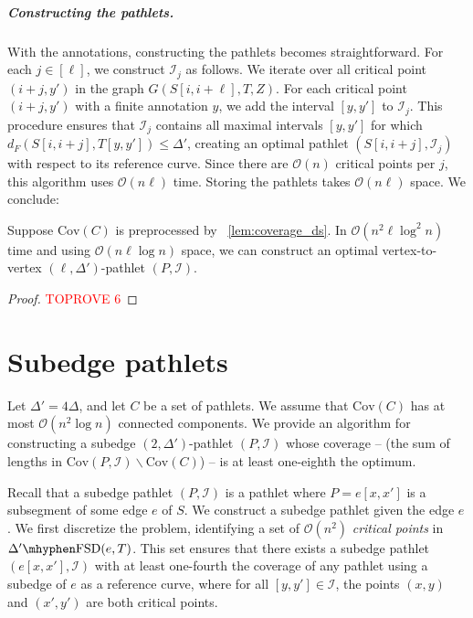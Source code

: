 \documentclass[a4paper,UKenglish,cleveref,thm-restate,notab]{lipics-v2021}
\newcommand{\dF}{\ensuremath{d_F}}
\newcommand{\FSD}[1][\Delta'] {\ensuremath{#1}\mhyphen\mathrm{FSD}}
\newcommand{\bigO}{\mathcal{O}}
\newcommand{\I}{\mathcal{I}}
\newcommand{\Cov}{\ensuremath{\mathrm{Cov}}}
\begin{document}
\subparagraph*{Constructing the pathlets.}
    With the annotations, constructing the pathlets becomes straightforward.
    For each $j \in [\ell]$, we construct $\I_j$ as follows.
    We iterate over all critical point $(i+j, y')$ in the graph $G(S[i, i+\ell], T, Z)$. 
    For each critical point $(i+j, y')$ with a finite annotation $y$, we add the interval $[y, y']$ to $\I_j$.
    This procedure ensures that $\I_j$ contains all maximal intervals $[y, y']$ for which $\dF(S[i, i+j], T[y, y']) \leq \Delta'$, creating an optimal pathlet $(S[i, i+j], \I_j)$ with respect to its reference curve.
    Since there are $\bigO(n)$ critical points per $j$, this algorithm uses $\bigO(n \ell)$ time.
    Storing the pathlets takes $\bigO(n \ell)$ space.
    We conclude:

    \begin{theorem}
    \label{thm:constructing_vertex-to-vertex}
        Suppose $\Cov(C)$ is preprocessed by ~\cref{lem:coverage_ds}.
        In $\bigO(n^2 \ell \log^2 n)$ time and using $\bigO(n \ell \log n)$ space, we can construct an optimal vertex-to-vertex $(\ell, \Delta')$-pathlet $(P, \I)$.
    \end{theorem}
    \begin{proof}\textcolor{red}{TOPROVE 6}\end{proof}

\section{Subedge pathlets}
\label{sec:subedge_pathlets}

    Let $\Delta' = 4\Delta$, and let $C$ be a set of pathlets. We assume that $\Cov(C)$ has at most $\bigO(n^2 \log n)$ connected components. 
    We provide an algorithm for constructing a subedge $(2, \Delta')$-pathlet $(P, \I)$ whose coverage -- (the sum of lengths in $\Cov(P, \I) \backslash \Cov(C)$)  -- is at least one-eighth the optimum.

    Recall that a subedge pathlet $(P, \I)$ is a pathlet where $P = e[x, x']$ is a subsegment of some edge $e$ of $S$.
    We construct a subedge pathlet given the edge $e$.
    We first discretize the problem, identifying a set of $\bigO(n^2)$ \emph{critical points} in $\FSD(e, T)$.
    This set ensures that there exists a subedge pathlet $(e[x, x'], \I)$ with at least one-fourth the coverage of any pathlet using a subedge of $e$ as a reference curve, where for all $[y, y'] \in \I$, the points $(x, y)$ and $(x', y')$ are both critical points.
\end{document}
